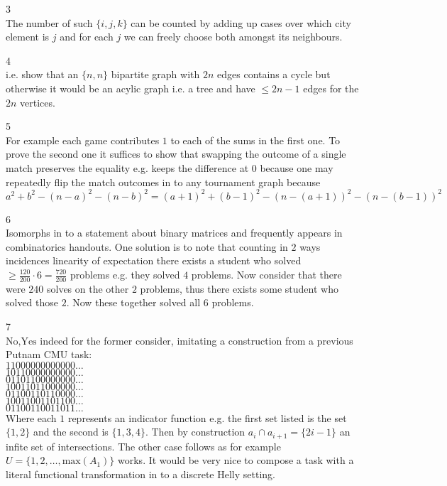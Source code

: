 3 \\
The number of such $\{i,j,k\}$ can be counted by adding up cases over which city element is $j$ and for each $j$ we can freely choose both amongst its neighbours.

4 \\
i.e. show that an $\{n,n\}$ bipartite graph with $2n$ edges contains a cycle but otherwise it would be an acylic graph i.e. a tree and have $\le 2n-1$ edges for the $2n$ vertices.

5 \\
For example each game contributes $1$ to each of the sums in the first one. To prove the second one it suffices to show that swapping the outcome of a single match preserves the equality e.g. keeps the difference at $0$ because one may repeatedly flip the match outcomes in to any tournament graph because $a^2+b^2-(n-a)^2-(n-b)^2=(a+1)^2+(b-1)^2-(n-(a+1))^2-(n-(b-1))^2$

6 \\
Isomorphs in to a statement about binary matrices and frequently appears in combinatorics handouts. One solution is to note that counting in $2$ ways incidences linearity of expectation there exists a student who solved $\ge \frac{120}{200} \cdot 6=\frac{720}{200}$ problems e.g. they solved $4$ problems. Now consider that there were $240$ solves on the other $2$ problems, thus there exists some student who solved those $2$. Now these together solved all $6$ problems.

7 \\
$\boxed{\text{No,Yes}}$ indeed for the former consider, imitating a construction from a previous Putnam CMU task: \\
$11000000000000\dots$ \\
$10110000000000\dots$ \\
$01101100000000\dots$ \\
$10011011000000\dots$ \\
$01100110110000\dots$ \\
$10011001101100\dots$ \\
$01100110011011\dots$ \\
Where each $1$ represents an indicator function e.g. the first set listed is the set  $\{1,2\}$ and the second is $\{1,3,4\}$. Then by construction $a_i \cap a_{i+1}=\{2i-1\}$ an infite set of intersections. The other case follows as for example $U=\{1,2,\dots,\text{max}(A_1)\}$ works. It would be very nice to compose a task with a literal functional transformation in to a discrete Helly setting.

